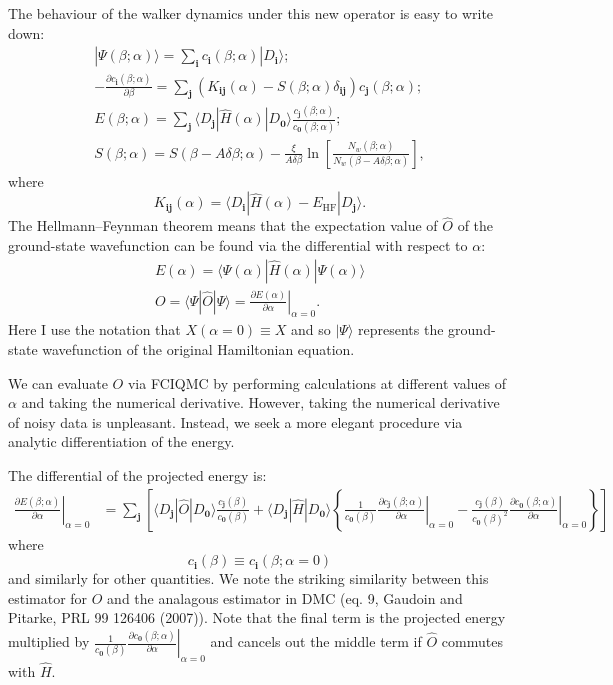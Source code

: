 \documentclass[a4paper, 11pt]{article}
\newcommand{\bi}{\mathbf{i}}
\newcommand{\bj}{\mathbf{j}}
\newcommand{\bz}{\mathbf{0}}
\newcommand{\dd}[2]{\frac{\partial#1}{\partial#2}}
\newcommand{\bra}{\langle}
\newcommand{\ket}{\rangle}
\newcommand{\EHF}{E_{\text{HF}}}
\begin{document}
The behaviour of the walker dynamics under this new operator is easy to write down:
\begin{gather}
|\Psi(\beta;\alpha)\ket = \sum_\bi c_\bi(\beta;\alpha) | D_\bi \ket; \\
- \dd{c_\bi(\beta;\alpha)}{\beta} = \sum_\bj (K_{\bi\bj}(\alpha) - S(\beta;\alpha) \delta_{\bi\bj}) c_\bj(\beta;\alpha);\\
E(\beta;\alpha) = \sum_\bj \bra D_\bj | \hat{H}(\alpha) | D_\bz \ket \frac{c_\bj(\beta;\alpha)}{c_\bz(\beta;\alpha)}; \\
S(\beta;\alpha) = S(\beta - A\delta\beta;\alpha) - \frac{\xi}{A\delta\beta} \ln{\left[\frac{N_w(\beta;\alpha)}{N_w(\beta-A\delta\beta;\alpha)}\right]},
\end{gather}
where
\begin{equation}
K_{\bi\bj}(\alpha) = \bra D_\bi | \hat{H}(\alpha) - \EHF | D_\bj \ket.
\end{equation}
The Hellmann--Feynman theorem means that the expectation value of $\hat{O}$ of the ground-state wavefunction can be found via the differential with respect to $\alpha$:
\begin{gather}
E(\alpha) = \bra \Psi(\alpha) | \hat{H}(\alpha) | \Psi(\alpha) \ket \\
O = \bra \Psi | \hat{O} | \Psi \ket = \left.\dd{E(\alpha)}{\alpha}\right|_{\alpha=0}.
\end{gather}
Here I use the notation that $X(\alpha=0) \equiv X$ and so $|\Psi\ket$ represents the ground-state wavefunction of the original Hamiltonian equation.

We can evaluate $O$ via FCIQMC by performing calculations at different values of $\alpha$ and taking the numerical derivative.  However, taking the numerical derivative of noisy data is unpleasant.  Instead, we seek a more elegant procedure via analytic differentiation of the energy.

The differential of the projected energy is:
\begin{align}
\left.\dd{E(\beta;\alpha)}{\alpha}\right|_{\alpha=0} &= \sum_\bj \left[ \bra D_\bj | \hat{O} | D_\bz \ket \frac{c_\bj(\beta)}{c_\bz(\beta)} + 
\bra D_\bj | \hat{H} | D_\bz \ket \left\{ 
       \frac{1}{c_\bz(\beta)} \left.\dd{c_\bj(\beta;\alpha)}{\alpha}\right|_{\alpha=0} -
       \frac{c_\bj(\beta)}{c_\bz(\beta)^2} \left.\dd{c_\bz(\beta;\alpha)}{\alpha}\right|_{\alpha=0}
   \right\} 
\right] 
\end{align}
where
\begin{equation}
c_\bi(\beta) \equiv c_\bi(\beta;\alpha=0)
\end{equation}
and similarly for other quantities.  We note the striking similarity between
this estimator for $O$ and the analagous estimator in DMC (eq. 9, Gaudoin and Pitarke, PRL 99 126406 (2007)).  Note that the final term is the projected energy multiplied by $\frac{1}{c_\bz(\beta)} \left.\dd{c_\bz(\beta;\alpha)}{\alpha}\right|_{\alpha=0}$ and cancels out the middle term if $\hat{O}$ commutes with $\hat{H}$.
\end{document}
